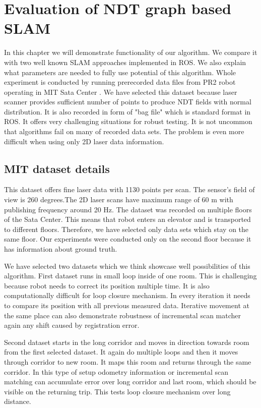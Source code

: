 \chapter{Evaluation of NDT graph based SLAM}
In this chapter we will demonstrate functionality of our algorithm. We compare it with two well known \gls{SLAM} approaches implemented in \gls{ROS}. We also explain what parameters are needed to fully use potential of this algorithm. Whole experiment is conducted by running prerecorded data files from PR2 robot operating in \gls{MIT} Sata Center \cite{MITDataset}. We have selected this dataset because laser scanner provides sufficient number of points to produce \gls{NDT} fields with normal distribution. It is also recorded in form of "bag file" which is standard format in \gls{ROS}. It offers very challenging situations for robust testing. It is not uncommon that algorithms fail on many of recorded data sets. The problem is even more difficult when using only 2D laser data information.

\section {MIT dataset details}
This dataset offers fine laser data with 1130 points per scan. The sensor's field of view is 260 degrees.The 2D laser scans have maximum range of 60 m with publishing frequency around 20 Hz. The dataset was recorded on multiple floors of the Sata Center. This means that robot enters an elevator and is transported to different floors. Therefore, we have selected only data sets which stay on the same floor. Our experiments were conducted only on the second floor because it has information about ground truth.

We have selected two datasets which we think showcase well possibilities of this algorithm. First dataset runs in small loop inside of one room. This is challenging because robot needs to correct its position multiple time. It is also computationally difficult for loop closure mechanism. In every iteration it needs to compare its position with all previous measured data. Iterative movement at the same place can also demonstrate robustness of incremental scan matcher again any shift caused by registration error.

Second dataset starts in the long corridor and moves in direction towards room from the first selected dataset. It again do multiple loops and then it moves through corridor to new room. It maps this room and returns through the same corridor. In this type of setup odometry information or incremental scan matching can accumulate error over long corridor and last room, which should be visible on the returning trip. This tests loop closure mechanism over long distance.

